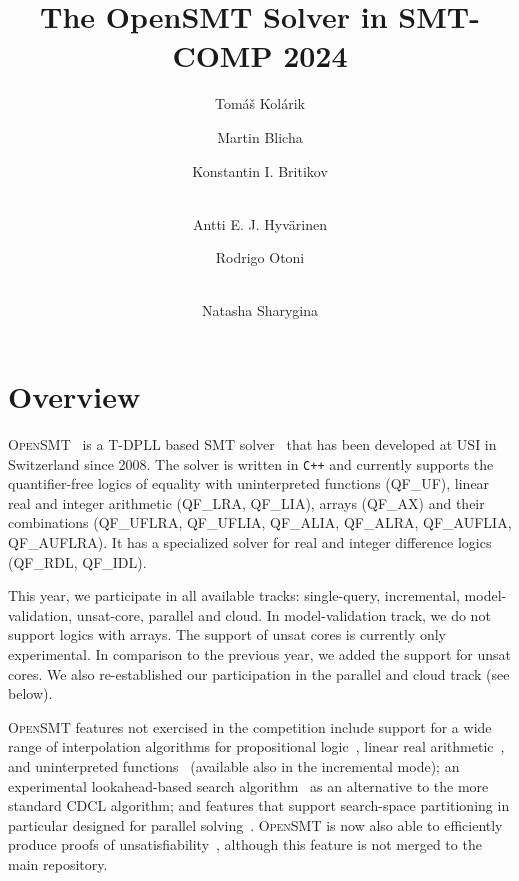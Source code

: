 \documentclass{easychair}
\title{The OpenSMT Solver in SMT-COMP 2024}
\author{
Tomáš Kolárik\inst{1} \and
Martin Blicha\inst{1,3} \and
Konstantin I. Britikov\inst{1} \and
\\
Antti E. J. Hyv{\"a}rinen\inst{2} \and
Rodrigo Otoni\inst{1} \and
\\
Natasha Sharygina\inst{1} \\
}
\institute{Universit{\`a} della Svizzera italiana (USI), Lugano,
Switzerland \and Certora \and Ethereum Foundation}
\date{}
\newcommand{\qflra}{QF\_LRA}
\newcommand{\qflia}{QF\_LIA}
\newcommand{\qfuf}{QF\_UF}
\newcommand{\qfbv}{QF\_BV}
\newcommand{\qfrdl}{QF\_RDL}
\newcommand{\qfidl}{QF\_IDL}
\newcommand{\qfuflra}{QF\_UFLRA}
\newcommand{\qfuflia}{QF\_UFLIA}
\newcommand{\qfax}{QF\_AX}
\newcommand{\qfauflia}{QF\_AUFLIA}
\newcommand{\qfauflra}{QF\_AUFLRA}
\newcommand{\qfalia}{QF\_ALIA}
\newcommand{\qfalra}{QF\_ALRA}
\newcommand{\opensmt}{\textsc{OpenSMT}\xspace}
\begin{document}
\maketitle

\section{Overview}

\opensmt~\cite{HyvarinenMAS16} is a T-DPLL based SMT
solver~\cite{NieuwenhuisOT:JACM06}
that has been developed at USI in Switzerland since 2008.
The solver is written in \texttt{C++} and
currently supports the quantifier-free logics of equality with
uninterpreted functions (\qfuf), linear real and integer arithmetic
(\qflra, \qflia), arrays (\qfax) and their combinations (\qfuflra, \qfuflia, \qfalia, \qfalra, \qfauflia, \qfauflra).
It has a specialized solver for real and integer difference logics (\qfrdl,
\qfidl).

This year, we participate in all available tracks:
single-query, incremental, model-validation, unsat-core, parallel and cloud.
In model-validation track, we do not support logics with arrays.
The support of unsat cores is currently only experimental.
In comparison to the previous year,
we added the support for unsat cores.
We also re-established our participation in the parallel and cloud track
(see below).

\opensmt features not exercised in the competition include support for a
wide range of interpolation algorithms for propositional
logic~\cite{AltFHS:VSTTE2015}, linear real
arithmetic~\cite{BlichaHKS19}, and uninterpreted
functions~\cite{AltHAS:FMCAD17} (available also in the incremental
mode); an experimental look\-ahead-based search
algorithm~\cite{HyvarinenMSCS18} as an alternative to the more standard
CDCL algorithm; and features that support search-space partitioning in
particular designed for parallel solving~\cite{HyvarinenMS:SAT15}.
\opensmt is now also able to efficiently produce proofs of
unsatisfiability~\cite{OtoniBEHS:DAC21}, although this feature is not merged to the main repository.
\end{document}

